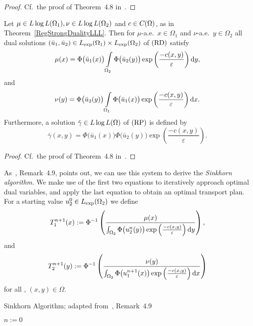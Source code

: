\begin{proof}
	Cf.~the proof of Theorem~4.8 in~\cite{Cla2021}.
\end{proof}

\begin{corollary}\label{RegOptCond}
	Let $\mu \in \LLL[\Omega_1], \nu \in \LLL[\Omega_2]$ and $c \in \CF{\Omega}$, as in Theorem~\ref{RegStrongDualityLLL}. Then for $\mu$-a.e.\ $x \in \Omega_1$ and $\nu$-a.e.\ $y \in \Omega_2$ all dual solutions $(\bar{u}_1, \bar{u}_2) \in \Lexp[\Omega_1] \times \Lexp[\Omega_2]$ of$\text{\normalfont\ (RD)}$ satisfy
	\[ \mu(x) = \Phi\big( \bar{u}_1(x) \big) \int\limits_{\Omega_2} \Phi\big( \bar{u}_2(y) \big) \exp \left( \frac{- c(x, y)}{\varepsilon} \right)\D[y], \]
	and
	\[ \nu(y) = \Phi\big( \bar{u}_2(y) \big) \int\limits_{\Omega_1} \Phi\big( \bar{u}_1(x) \big) \exp \left( \frac{- c(x, y)}{\varepsilon} \right)\D[x]. \]
	Furthermore, a solution $\bar{\gamma} \in \LLL$ of$\text{\normalfont\ (RP)}$ is defined by
	\[ \bar{\gamma}(x, y) = \Phi\big( \bar{u}_1(x) \big) \Phi\big( \bar{u}_2(y) \big) \exp\left( \frac{- c(x, y)}{\varepsilon} \right). \]
\end{corollary}

\begin{proof}
	Cf.~the proof of Theorem~4.8 in~\cite{Cla2021}.
\end{proof}

As~\cite{Cla2021}, Remark~4.9, points out, we can use this system to derive the \textit{Sinkhorn algorithm}. We make use of the first two equations to iteratively approach optimal dual variables, and apply the last equation to obtain an optimal transport plan. For a starting value $u_2^0 \in \Lexp[\Omega_2]$ we define
\[ T_1^{n + 1}(x) := \Phi^{-1} \left( \frac{\mu(x)}{\int_{\Omega_2} \Phi\big( u_2^n(y) \big) \exp\left( \frac{-c(x, y)}{\varepsilon} \right)\D[y]} \right), \]
and
\[ T_2^{n + 1}(y) := \Phi^{-1} \left( \frac{\nu(y)}{\int_{\Omega_2} \Phi\big( u_1^{n + 1}(x) \big) \exp\left( \frac{-c(x, y)}{\varepsilon} \right)\D[x]} \right) \]
for all \NinN, $(x, y) \in \Omega$.
\begin{algorithm}\label{SinkhornAlg}
	\caption{Sinkhorn Algorithm; adapted from~\cite{Cla2021}, Remark~4.9}
	$n := 0$\;
\end{algorithm}

